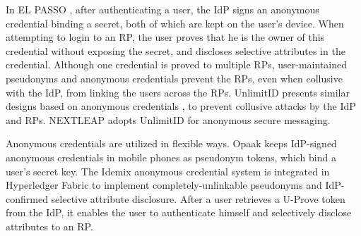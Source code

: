 In EL PASSO \cite{ELPASSO}, after authenticating a user,
    the IdP signs an anonymous credential \cite{anon-credential} binding a secret,
         both of which are kept on the user's device.
When attempting to login to an RP,
    the user proves that he is the owner of this credential without exposing the secret,
        and discloses selective attributes in the credential.
Although one credential is proved to multiple RPs,
        user-maintained pseudonyms and anonymous credentials prevent the RPs, even when collusive with the IdP, from linking the users across the RPs.
UnlimitID \cite{UnlimitID} presents similar designs based on anonymous credentials \cite{anon-credential},
        to prevent collusive attacks by the IdP and RPs.
NEXTLEAP \cite{nextleap} adopts UnlimitID for anonymous secure messaging.


Anonymous credentials \cite{anon-credential-2001,anon-credential} are utilized in flexible ways.
Opaak \cite{Opaak} keeps IdP-signed anonymous credentials in mobile phones as pseudonym tokens,
    which bind a user's secret key.
The Idemix anonymous credential system \cite{idemix}
 is integrated in Hyperledger Fabric \cite{hyperledge-idemix} to implement completely-unlinkable pseudonyms
        and IdP-confirmed selective attribute disclosure.
After a user retrieves a U-Prove token \cite{uprov,uprove-conference} from the IdP,
    it enables the user to authenticate himself and selectively disclose attributes to an RP.

